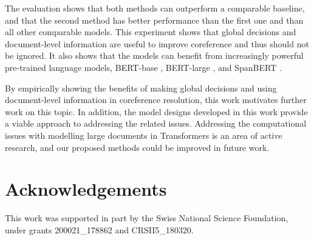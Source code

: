 \documentclass[11pt]{article}
\begin{document}
The evaluation shows that both methods can outperform a comparable baseline, and that the second method has better performance than the first one and than all other comparable models. This experiment shows that global decisions and document-level information are useful to improve coreference and thus should not be ignored. It also shows that the models can benefit from increasingly powerful pre-trained language models, BERT-base \cite{devlin-etal-2019-bert}, BERT-large \cite{devlin-etal-2019-bert}, and SpanBERT \cite{joshi-etal-2020-spanbert}. 

By empirically showing the benefits of making global decisions and using document-level information in coreference resolution, this work motivates further work on this topic. In addition, the model designs developed in this work provide a viable approach to addressing the related issues. Addressing the computational issues with modelling large documents in Transformers is an area of active research, and our proposed methods could be improved in future work.


\section*{Acknowledgements}

This work was supported in part by the Swiss National Science Foundation, under grants 200021\_178862 and CRSII5\_180320.




\end{document}

